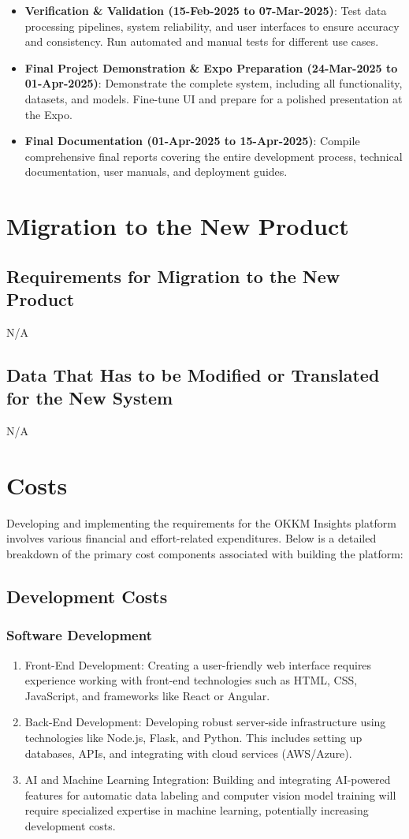 \documentclass[12pt]{article}
\begin{document}
\begin{itemize}
    \item \textbf{Verification \& Validation (15-Feb-2025 to 07-Mar-2025)}: Test data processing pipelines, system reliability, and user interfaces to ensure accuracy and consistency. Run automated and manual tests for different use cases.
    \item \textbf{Final Project Demonstration \& Expo Preparation (24-Mar-2025 to 01-Apr-2025)}: Demonstrate the complete system, including all functionality, datasets, and models. Fine-tune UI and prepare for a polished presentation at the Expo.
    \item \textbf{Final Documentation (01-Apr-2025 to 15-Apr-2025)}: Compile comprehensive final reports covering the entire development process, technical documentation, user manuals, and deployment guides.
\end{itemize}

\section{Migration to the New Product}
\subsection{Requirements for Migration to the New Product}
N/A
\subsection{Data That Has to be Modified or Translated for the New System}
N/A

\section{Costs}
Developing and implementing the requirements for the OKKM Insights platform involves various financial and effort-related expenditures. 
    Below is a detailed breakdown of the primary cost components associated with building the platform:

\subsection{Development Costs}
\subsubsection{Software Development}
\begin{enumerate}
    \item Front-End Development: Creating a user-friendly web interface requires experience working with front-end technologies such as HTML, CSS, JavaScript, and frameworks like React or Angular.
    \item Back-End Development: Developing robust server-side infrastructure using technologies like Node.js, Flask, and Python. This includes setting up databases, APIs, and integrating with cloud services (AWS/Azure).
    \item AI and Machine Learning Integration: Building and integrating AI-powered features for automatic data labeling and computer vision model training will require specialized expertise in machine learning, potentially increasing development costs.
  \end{enumerate}
\end{document}
